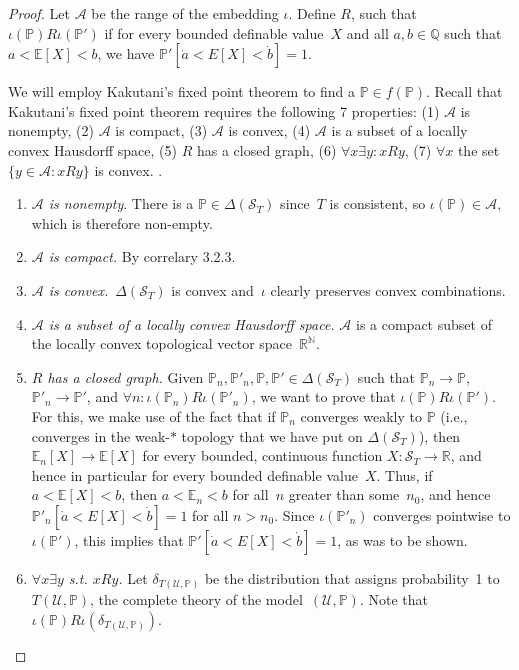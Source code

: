 \documentclass[12pt]{article}
\newcommand{\PP}{\mathbb{P}}
\newcommand{\EE}{\mathbb{E}}
\newcommand{\RR}{\mathbb{R}}
\newcommand{\NN}{\mathbb{N}}
\newcommand{\QQ}{\mathbb{Q}}
\newcommand{\cA}{\mathcal{A}}
\newcommand{\cS}{\mathcal{S}}
\newcommand{\cU}{\mathcal{U}}
\theoremstyle{plain}
\theoremstyle{definition}
\theoremstyle{remark}
\begin{document}
\begin{proof}
Let $\cA$ be the range of the embedding $\iota$. Define $R$, such that $\iota(\PP)R\iota(\PP')$ if for every bounded definable value~$X$ and all $a,b\in\QQ$ such that $a<\EE[X]<b$, we have $\PP'[\dot a < E[X] < \dot b] = 1$.

We will employ Kakutani's fixed point theorem to find a $\PP \in f(\PP)$. Recall that Kakutani's fixed point theorem requires the following 7 properties:
(1) $\mathcal{A}$ is nonempty,
(2) $\mathcal{A}$ is compact,
(3) $\mathcal{A}$ is convex,
(4) $\mathcal{A}$ is a subset of a locally convex Hausdorff space,
(5) $R$ has a closed graph,
(6) $\forall x \exists y : xRy$,
(7) $\forall x$ the set $\{y \in \mathcal{A}: xRy\}$ is convex.
\cite{kakutani41}.

\begin{enumerate}
\item \emph{$\mathcal{A}$ is nonempty}. There is a $\PP\in\Delta(\cS_T)$ since~$T$ is consistent, so $\iota(\PP)\in\cA$, which is therefore non-empty.

\item \emph{$\mathcal{A}$ is compact.} By correlary 3.2.3.

\item \emph{$\mathcal{A}$ is convex.}~$\Delta(\cS_T)$ is convex and~$\iota$ clearly preserves convex combinations.

\item \emph{$\mathcal{A}$ is a subset of a locally convex Hausdorff space.} $\mathcal{A}$ is a compact subset of the locally convex topological vector space~$\RR^\NN$.

\item \emph{$R$ has a closed graph.} Given $\PP_n,\PP'_n,\PP,\PP'\in\Delta(\cS_T)$ such that $\PP_n\to\PP$, $\PP'_n\to\PP'$, and $\forall n : \iota(\PP_n)R\iota(\PP'_n)$, we want to prove that $\iota(\PP)R\iota(\PP')$. For this, we make use of the fact that if $\PP_n$ converges weakly to $\PP$ (i.e., converges in the weak-$*$ topology that we have put on $\Delta(\cS_T)$), then $\EE_n[X]\to\EE[X]$ for every bounded, continuous function $X : \cS_T\to\RR$, and hence in particular for every bounded definable value~$X$. Thus, if $a < \EE[X] < b$, then $a < \EE_n < b$ for all~$n$ greater than some~$n_0$, and hence $\PP'_n[\dot a < E[X] < \dot b] = 1$ for all $n>n_0$. Since $\iota(\PP'_n)$ converges pointwise to $\iota(\PP')$, this implies that $\PP'[\dot a < E[X] < \dot b] = 1$, as was to be shown.

\item \emph{$\forall x \exists y$ s.t. $xRy$.} Let $\delta_{T(\cU,\PP)}$ be the distribution that assigns probability~1 to~$T(\cU,\PP)$, the complete theory of the model~$(\cU,\PP)$. Note that $\iota(\PP)R\iota(\delta_{T(\cU,\PP)})$.


\end{enumerate}
\end{proof}
\end{document}
